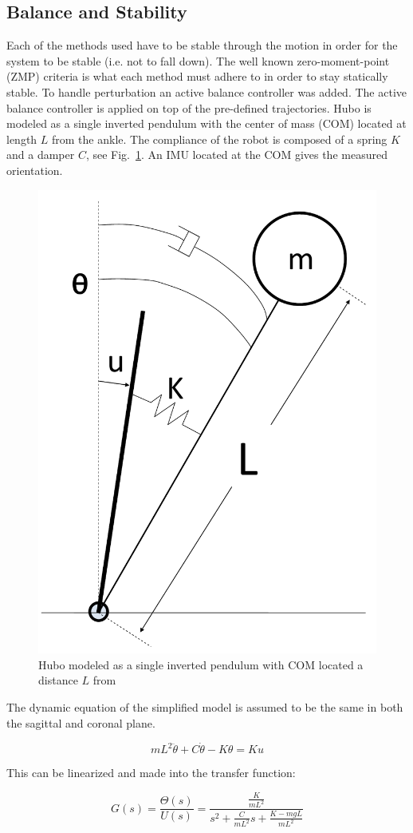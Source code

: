 \subsection{Balance and Stability}\label{sec:sec:balance}
Each of the methods used have to be stable through the motion in order for the system to be stable (i.e. not to fall down).  
The well known zero-moment-point (ZMP) criteria is what each method must adhere to in order to stay statically stable\cite{Vukobratovic19721}.  
To handle perturbation an active balance controller was added.  
The active balance controller is applied on top of the pre-defined trajectories.  
Hubo is modeled as a single inverted pendulum with the center of mass (COM) located at length $L$ from the ankle.  
The compliance of the robot is composed of a spring $K$ and a damper $C$, see Fig.~\ref{fig:invPen}.  
An IMU located at the COM gives the measured orientation.

\begin{figure}[t]
  \centering
\includegraphics[width=0.4\columnwidth]{./pix/invPen3.pdf}
  \caption{Hubo modeled as a single inverted pendulum with COM located a distance $L$ from }
  \label{fig:invPen}
\end{figure}

The dynamic equation of the simplified model is assumed to be the same in both the sagittal and coronal plane.

\begin{equation}
mL^2\ddot{\theta}+C\dot{\theta}-K\theta = Ku
\end{equation}

This can be linearized and made into the transfer function:

\begin{equation}
G(s) = \frac{\Theta(s)}{U(s)} = \frac{\frac{K}{mL^2}}{s^2+\frac{C}{mL^2}s + \frac{K-mgL}{mL^2}}
\end{equation}

